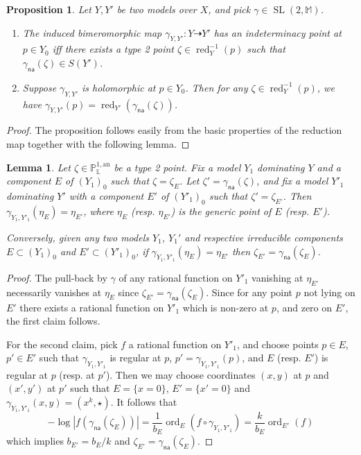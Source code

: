 \documentclass[11pt]{article}
\newtheorem{lemm}[theo]{Lemma}
\newtheorem{prop}[theo]{Proposition}
\theoremstyle{definition}
\numberwithin{equation}{section}
\numberwithin{figure}{section}
\numberwithin{table}{section}
\DeclareMathOperator{\red}{red}
\DeclareMathOperator{\ord}{ord}
\DeclareMathOperator{\SL}{SL}
\newcommand{\mm}{\mathbb{M}}
\newcommand{\an}{\mathrm{an}}
\newcommand{\berkl}{\mathbb P^{1,\an}_{\Laurent}}
\newcommand{\Laurent}{\mathbb{L}}
\newcommand{\na}{\mathsf{na}}
\begin{document}
\begin{prop}\label{prop:val-geom}
Let $Y,Y'$ be two models over $X$, and pick $\gamma\in \SL(2,\mm)$.
\begin{enumerate}
\item The induced bimeromorphic map $\gamma_{Y,Y'}: Y \dashrightarrow Y'$ has an indeterminacy point at $p\in Y_0$ iff there exists a type 2 point $\zeta \in \red^{-1}_{Y}(p)$ such that $\gamma_\na(\zeta) \in S(Y')$.
\item Suppose $\gamma_{Y,Y'}$ is holomorphic at $p\in Y_0$. Then for any $\zeta \in \red_{Y}^{-1}(p)$, we have $\gamma_{Y,Y'}(p) = \red_{Y'} (\gamma_\na(\zeta))$.
\end{enumerate}
\end{prop}

\begin{proof}
The proposition follows easily from the basic properties of the reduction map together with the following lemma.
\end{proof}

\begin{lemm}
Let $\zeta\in\berkl$ be a type 2 point. Fix a model $Y_1$ dominating $Y$ and a component $E$ of $(Y_1)_0$ such that $\zeta = \zeta_E$. Let $\zeta' = \gamma_\na(\zeta)$, and fix a model $Y'_1$ dominating $Y'$ with a component $E'$ of $(Y'_1)_0$ such that $\zeta' = \zeta_{E'}$. Then $\gamma_{Y_1, Y'_1}(\eta_E) = \eta_{E'}$, where $\eta_E$ (resp. $\eta_{E'}$) is the generic point of $E$ (resp. $E'$).

Conversely, given any two models $Y_1$, $Y_1'$ and respective irreducible components $E \subset (Y_1)_0$ and $E' \subset (Y'_1)_0$, if $\gamma_{Y_1, Y'_1}(\eta_E) = \eta_{E'}$ then $\zeta_{E'} = \gamma_\na(\zeta_{E})$.
\end{lemm}

\begin{proof}
The pull-back by $\gamma$ of any rational function on $Y'_1$ vanishing at $\eta_{E'}$ necessarily vanishes at $\eta_E$ since $\zeta_{E'} = \gamma_\na(\zeta_E)$. Since for any point $p$ not lying on $E'$ there exists a rational function on $Y'_1$ which is non-zero at $p$, and zero on $E'$, the first claim follows.

For the second claim, pick $f$ a rational function on $Y'_1$, and choose points $p\in E$, $p'\in E'$ such that $\gamma_{Y_1, Y'_1}$ is regular at $p$, $p' = \gamma_{Y_1, Y'_1}(p)$, and $E$ (resp. $E'$) is regular at $p$ (resp. at $p'$). Then we may choose coordinates $(x,y)$ at $p$ and $(x',y')$ at $p'$ such that $E = \{ x=0\}$, $E' = \{ x'=0\}$ and $\gamma_{Y_1, Y'_1} (x,y) = (x^k, \star)$. It follows that
\[
-\log|f(\gamma_\na(\zeta_{E}))| = \frac1{b_E}\ord_{E}(f \circ \gamma_{Y_1, Y'_1}) = \frac{k}{b_E}\ord_{E'}(f)
\]
which implies $ b_{E'} = b_E/k$ and $\zeta_{E'} = \gamma_\na(\zeta_{E})$.
\end{proof}
\end{document}
